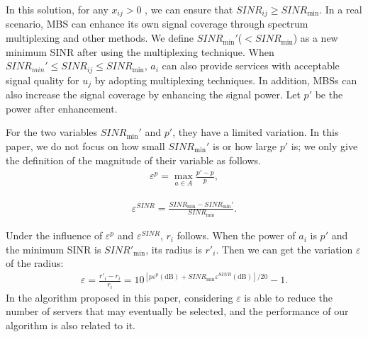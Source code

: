 \documentclass[journal]{IEEEtran}
\begin{document}
In this solution, for any $x_{ij}>0$ , we can ensure that $SINR_{ij}\ge SINR_{\min}$. In a real scenario, MBS can enhance its own signal coverage through spectrum multiplexing and other methods. We define $SINR_{\min}'$($<SINR_{\min}$) as a new minimum SINR after using the multiplexing technique. When $SINR_{min}' \le SINR_{ij} \le SINR_{\min}$, $a_i$ can also provide services with acceptable signal quality for $u_j$ by adopting multiplexing techniques. In addition, MBSs can also increase the signal coverage by enhancing the signal power. Let $p'$ be the power after enhancement.


For the two variables $SINR_{\min}'$ and $p'$, they have a limited variation. In this paper, we do not focus on how small $SINR_{\min}'$ is or how large $p'$ is; we only give the definition of the magnitude of their variable as follows.
\begin{eqnarray}
	{\varepsilon ^p} = \mathop {\max }\limits_{{a} \in A} \frac{{{p'} - {p}}}{{{p}}},
\end{eqnarray}


\begin{eqnarray}
	{\varepsilon ^{SINR}} = \frac{{SINR_{\min}} - SINR_{\min}'}{{SIN{R_{\min }}}}.
\end{eqnarray}





Under the influence of $\varepsilon^p$ and $\varepsilon^{SINR}$, $r_i$ follows. When the power of $a_i$ is $p'$ and the minimum SINR is $SINR'_{\min}$, its radius is $r'_i$. Then we can get the variation $\varepsilon$ of the radius:
\begin{eqnarray}
	\label{eq9}
	\varepsilon = \frac{r'_i-r_i}{r_i} = 10^{\left[p\varepsilon^p({\text{dB}}) + SINR_{\min}\varepsilon^{SINR}({\text{dB}})\right]/{20}} - 1.
\end{eqnarray}
In the algorithm proposed in this paper, considering $\varepsilon$ is able to reduce the number of servers that may eventually be selected, and the performance of our algorithm is also related to it.
\end{document}
